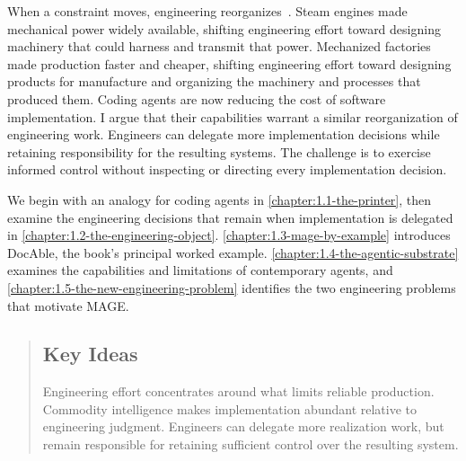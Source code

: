 

When a constraint moves, engineering reorganizes~\citep{amdahl1967,goldratt1984}. Steam engines made mechanical power widely available, shifting engineering effort toward designing machinery that could harness and transmit that power. Mechanized factories made production faster and cheaper, shifting engineering effort toward designing products for manufacture and organizing the machinery and processes that produced them. Coding agents are now reducing the cost of software implementation. I argue that their capabilities warrant a similar reorganization of engineering work. Engineers can delegate more implementation decisions while retaining responsibility for the resulting systems. The challenge is to exercise informed control without inspecting or directing every implementation decision.

We begin with an analogy for coding agents in \cref{chapter:1.1-the-printer}, then examine the engineering decisions that remain when implementation is delegated in \cref{chapter:1.2-the-engineering-object}. \cref{chapter:1.3-mage-by-example} introduces DocAble, the book's principal worked example. \cref{chapter:1.4-the-agentic-substrate} examines the capabilities and limitations of contemporary agents, and \cref{chapter:1.5-the-new-engineering-problem} identifies the two engineering problems that motivate MAGE.



\begin{quote}
\mbox{}%
\subsection{Key Ideas}\label{heading:founding-premise}

Engineering effort concentrates around what limits reliable production. Commodity intelligence makes implementation abundant relative to engineering judgment. Engineers can delegate more realization work, but remain responsible for retaining sufficient control over the resulting system.
\end{quote}

